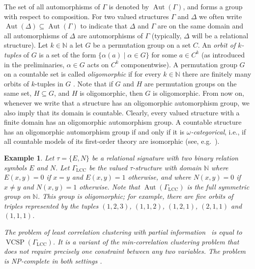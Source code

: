 \documentclass[nonacm]{acmart}
\DeclareMathOperator{\Aut}{Aut}
\DeclareMathOperator{\VCSP}{VCSP}
\newtheorem{expl}[theorem]{Example}
\begin{document}
The set of all automorphisms of $\Gamma$ is denoted by $\Aut(\Gamma)$, and forms a group with respect to composition. For two valued structures $\Gamma$ and $\Delta$ we often write $\Aut(\Delta) \subseteq \Aut(\Gamma)$ to indicate that $\Delta$ and $\Gamma$ are on the same domain and all automorphisms of $\Delta$ are automorphisms of $\Gamma$ (typically, $\Delta$ will be a relational structure).
Let $k \in {\mathbb N}$ a let $G$ be a permutation group on a set $C$.
An \emph{orbit of $k$-tuples} of 
$G$ is a set of the form $\{ \alpha(a) \mid \alpha \in G \}$ for some $a \in C^k$ (as introduced in the preliminaries, $\alpha \in G$ acts on $C^k$ componentwise). 
A permutation group $G$ on a countable set is called \emph{oligomorphic} if for every $k \in {\mathbb N}$ there are finitely many orbits of $k$-tuples in $G$ \cite{Oligo}. 
Note that if $G$ and $H$ are permutation groups on the same set, $H \subseteq G$, and $H$ is oligomorphic, then $G$ is oligomorphic.
From now on, whenever we write that a structure has an oligomorphic automorphism group, we also imply that its domain is countable. 
Clearly, every valued structure with a finite domain has an oligomorphic automorphism group. A countable structure has an oligomorphic automorphism group if and only if it is \emph{$\omega$-categorical}, i.e., if all countable models of its first-order theory are isomorphic (see, e.g.~\cite[Theorem 6.3.1]{Hodges}). 

\begin{expl}\label{expl:MCC}
Let $\tau = \{E,N\}$ be a relational signature with two binary relation symbols $E$ and $N$. 
Let $\Gamma_{\text{LCC}}$ be the valued $\tau$-structure with domain ${\mathbb N}$ where
$E(x,y) = 0$ if $x = y$ and $E(x,y)=1$ otherwise, and where $N(x,y) = 0$ if $x \neq y$ and $N(x,y)=1$ otherwise.
%
Note that $\Aut(\Gamma_{\text{LCC}})$ is the full symmetric group on $\mathbb{N}$. This group is oligomorphic; for example, there are five orbits of triples represented by the tuples $(1,2,3)$, $(1,1,2)$, $(1,2,1)$, $(2,1,1)$ and $(1,1,1)$.

The problem of \emph{least correlation clustering with partial information}~\cite[Example 5]{ViolaThesis}
is equal to $\VCSP(\Gamma_{\text{LCC}})$.
It is a variant of the min-correlation clustering problem \cite{CorrelationClustering}
that does not require precisely one constraint between any two variables.
The problem is NP-complete in both settings \cite{GareyJohnson, ViolaThesis}.
\end{expl}
\end{document}
